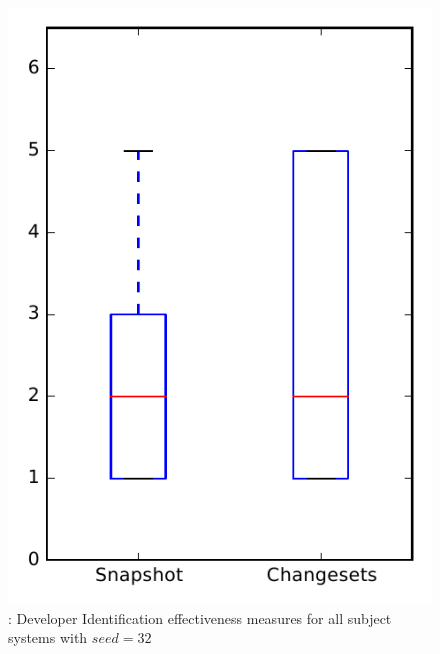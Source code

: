 
\begin{figure}
\centering
\includegraphics[height=0.4\textheight]{figures/dit_seed/rq1_overview_32}
\caption{\rtwo: Developer Identification effectiveness measures for all subject systems with $seed=32$}
\label{fig:dit_seed:rq1:overview}
\end{figure}
